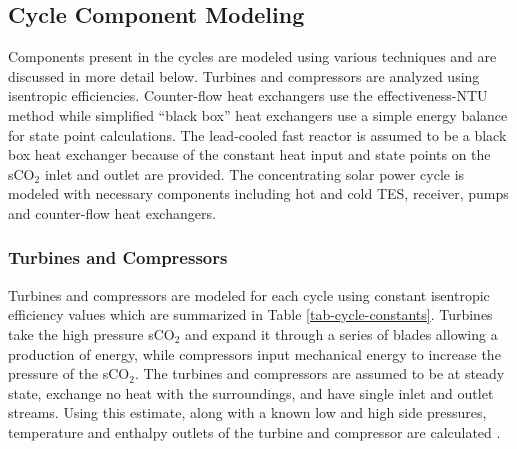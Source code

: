 



\subsection{Cycle Component Modeling}
Components present in the cycles are modeled using various techniques and are discussed in more detail below. Turbines and compressors are analyzed using isentropic efficiencies. Counter-flow heat exchangers use the effectiveness-NTU method while simplified ``black box'' heat exchangers use a simple energy balance for state point calculations. The lead-cooled fast reactor is assumed to be a black box heat exchanger because of the constant heat input and state points on the sCO$_2$ inlet and outlet are provided. The concentrating solar power cycle is modeled with necessary components including hot and cold TES, receiver, pumps and counter-flow heat exchangers.


\subsubsection{Turbines and Compressors }

Turbines and compressors are modeled for each cycle using constant isentropic efficiency values which are summarized in Table \ref{tab-cycle-constants}. Turbines take the high pressure sCO$_2$ and expand it through a series of blades allowing a production of energy, while compressors input mechanical energy to increase the pressure of the sCO$_2$. The turbines and compressors are assumed to be at steady state, exchange no heat with the surroundings, and have single inlet and outlet streams. Using this estimate, along with a known low and high side pressures, temperature and enthalpy outlets of the turbine and compressor are calculated \cite{klein_nellis_2011}. 

